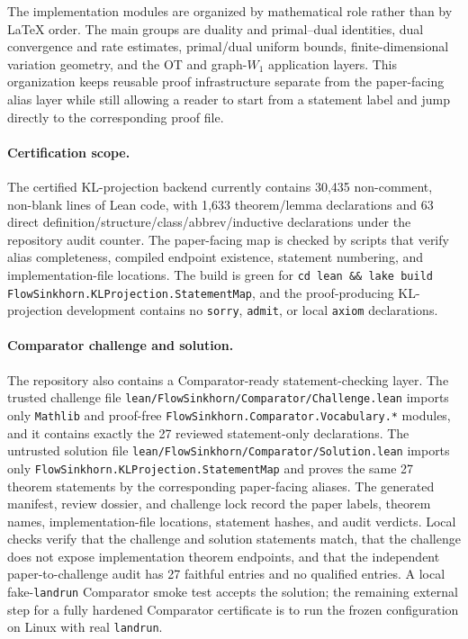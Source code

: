 \documentclass{article}
\theoremstyle{plain}
\begin{document}
The implementation modules are organized by mathematical role rather than by LaTeX order.  The main groups are duality and primal--dual identities, dual convergence and rate estimates, primal/dual uniform bounds, finite-dimensional variation geometry, and the OT and graph-$W_1$ application layers.  This organization keeps reusable proof infrastructure separate from the paper-facing alias layer while still allowing a reader to start from a statement label and jump directly to the corresponding proof file.

\paragraph{Certification scope.}
The certified KL-projection backend currently contains 30{,}435 non-comment, non-blank lines of Lean code, with 1{,}633 theorem/lemma declarations and 63 direct definition/structure/class/abbrev/inductive declarations under the repository audit counter.  The paper-facing map is checked by scripts that verify alias completeness, compiled endpoint existence, statement numbering, and implementation-file locations.  The build is green for \texttt{cd lean \&\& lake build FlowSinkhorn.KLProjection.StatementMap}, and the proof-producing KL-projection development contains no \texttt{sorry}, \texttt{admit}, or local \texttt{axiom} declarations.

\paragraph{Comparator challenge and solution.}
The repository also contains a Comparator-ready statement-checking layer.  The trusted challenge file \texttt{lean/\allowbreak FlowSinkhorn/\allowbreak Comparator/\allowbreak Challenge.lean} imports only \texttt{Mathlib} and proof-free \texttt{FlowSinkhorn.Comparator.Vocabulary.*} modules, and it contains exactly the 27 reviewed statement-only declarations.  The untrusted solution file \texttt{lean/\allowbreak FlowSinkhorn/\allowbreak Comparator/\allowbreak Solution.lean} imports only \texttt{FlowSinkhorn.KLProjection.StatementMap} and proves the same 27 theorem statements by the corresponding paper-facing aliases.  The generated manifest, review dossier, and challenge lock record the paper labels, theorem names, implementation-file locations, statement hashes, and audit verdicts.  Local checks verify that the challenge and solution statements match, that the challenge does not expose implementation theorem endpoints, and that the independent paper-to-challenge audit has 27 faithful entries and no qualified entries.  A local fake-\texttt{landrun} Comparator smoke test accepts the solution; the remaining external step for a fully hardened Comparator certificate is to run the frozen configuration on Linux with real \texttt{landrun}.
\end{document}
